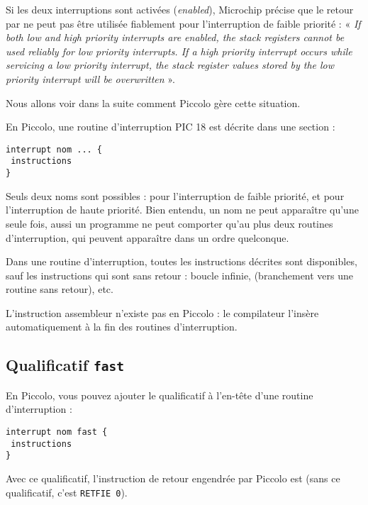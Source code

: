 Si les deux interruptions sont activées (\emph{enabled}), Microchip précise que le retour par  ne peut pas être utilisée fiablement pour l’interruption de faible priorité : « \emph{If both low and high priority interrupts are enabled, the stack registers cannot be used reliably for low priority interrupts. If a high priority interrupt occurs while servicing a low priority interrupt, the stack register values stored by the low priority interrupt will be overwritten} ».

Nous allons voir dans la suite comment Piccolo gère cette situation.

En Piccolo, une routine d’interruption PIC 18 est décrite dans une section  :

\begin{lstlisting}[language=piccolo]
interrupt nom ... {
 instructions
}
\end{lstlisting}

Seuls deux noms sont possibles :  pour l’interruption de faible priorité, et  pour l’interruption de haute priorité. Bien entendu, un nom ne peut apparaître qu’une seule fois, aussi un programme ne peut comporter qu'au plus deux routines d'interruption, qui peuvent apparaître dans un ordre quelconque.

Dans une routine d'interruption, toutes les instructions décrites sont disponibles, sauf les instructions qui sont sans retour : boucle infinie,  (branchement vers une routine sans retour), etc.

L’instruction assembleur  n’existe pas en Piccolo : le compilateur l’insère automatiquement à la fin des routines d’interruption.



\subsection{Qualificatif \texttt{fast}}

En Piccolo, vous pouvez ajouter le qualificatif  à l’en-tête d’une routine d’interruption :

\begin{lstlisting}[language=piccolo]
interrupt nom fast {
 instructions
}
\end{lstlisting}

Avec ce qualificatif, l’instruction de retour engendrée par Piccolo est  (sans ce qualificatif, c’est \texttt{RETFIE 0}).

